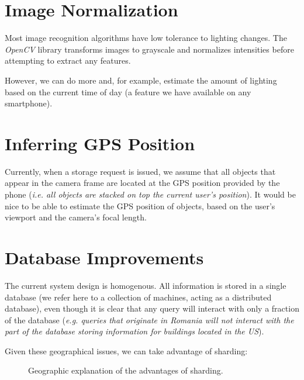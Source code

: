 \documentclass[a4paper,onecolumn,oneside,titlepage,11pt]{report}
\begin{document}
\section*{Image Normalization}
Most image recognition algorithms have low tolerance to lighting changes. The \emph{OpenCV} library transforms images to grayscale and normalizes intensities before attempting to extract any features.

However, we can do more and, for example, estimate the amount of lighting based on the current time of day (a feature we have available on any smartphone).

\section*{Inferring GPS Position}
Currently, when a storage request is issued, we assume that all objects that appear in the camera frame are located at the GPS position provided by the phone (\emph{i.e. all objects are stacked on top the current user's position}). It would be nice to be able to estimate the GPS position of objects, based on the user's viewport and the camera's focal length.

\section*{Database Improvements}
The current system design is homogenous. All information is stored in a single database (we refer here to a collection of machines, acting as a distributed database), even though it is clear that any query will interact with only a fraction of the database (\emph{e.g. queries that originate in Romania will not interact with the part of the database storing information for buildings located in the US}).

Given these geographical issues, we can take advantage of sharding:
\begin{figure}[H]
\begin{center}
\end{center}
\caption{Geographic explanation of the advantages of sharding.}
\end{figure}
\end{document}

